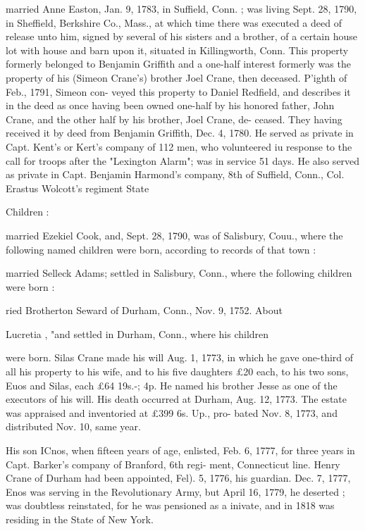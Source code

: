 \documentclass{book}
\begin{document}
married Anne Easton, Jan. 9, 1783, in Suffield, Conn. ; was 
living Sept. 28, 1790, in Sheffield, Berkshire Co., Mass., at 
which time there was executed a deed of release unto him, signed 
by several of his sisters and a brother, of a certain house lot with 
house and barn upon it, situated in Killingworth, Conn. This 
property formerly belonged to Benjamin Griffith and a one-half 
interest formerly was the property of his (Simeon Crane's) brother 
Joel Crane, then deceased. P'ighth of Feb., 1791, Simeon con- 
veyed this property to Daniel Redfield, and describes it in the 
deed as once having been owned one-half by his honored father, 
John Crane, and the other half by his brother, Joel Crane, de- 
ceased. They having received it by deed from Benjamin Griffith, 
Dec. 4, 1780. He served as private in Capt. Kent's or Kert's 
company of 112 men, who volunteered iu response to the call for 
troops after the "Lexington Alarm"; was in service 51 days. 
He also served as private in Capt. Benjamin Harmond's company, 
8th of Suffield, Conn., Col. Erastus Wolcott's regiment State 




Children : 


married Ezekiel Cook, and, Sept. 28, 1790, was of Salisbury, 
Couu., where the following named children were born, according 
to records of that town : 





married Selleck Adams; settled in Salisbury, Conn., where the 
following children were born : 







ried Brotherton Seward of Durham, Conn., Nov. 9, 1752. About 






Lucretia , "and settled in Durham, Conn., where his children 

were born. Silas Crane made his will Aug. 1, 1773, in which he 
gave one-third of all his property to his wife, and to his five 
daughters £20 each, to his two sons, Euos and Silas, each £64  
19s.-; 4p. He named his brother Jesse as one of the executors 
of his will. His death occurred at Durham, Aug. 12, 1773. The 
estate was appraised and inventoried at £399  6s.  Up., pro- 
bated Nov. 8, 1773, and distributed Nov. 10, same year. 

His son ICnos, when fifteen years of age, enlisted, Feb. 6, 1777, 
for three years in Capt. Barker's company of Branford, 6th regi- 
ment, Connecticut line. Henry Crane of Durham had been 
appointed, Fel). 5, 1776, his guardian. Dec. 7, 1777, Enos was 
serving in the Revolutionary Army, but April 16, 1779, he 
deserted ; was doubtless reinstated, for he was pensioned as a 
inivate, and in 1818 was residing in the State of New York. 
\end{document}

